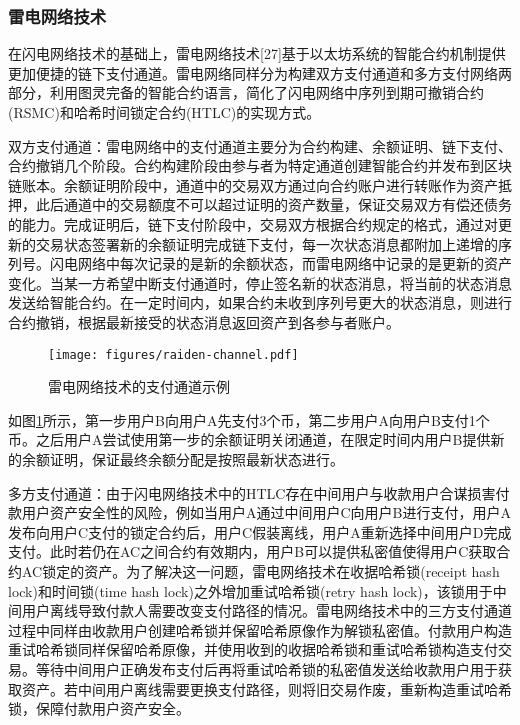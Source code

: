 \subsubsection{雷电网络技术}

在闪电网络技术的基础上，雷电网络技术[27]基于以太坊系统的智能合约机制提供更加便捷的链下支付通道。雷电网络同样分为构建双方支付通道和多方支付网络两部分，利用图灵完备的智能合约语言，简化了闪电网络中序列到期可撤销合约(RSMC)和哈希时间锁定合约(HTLC)的实现方式。

双方支付通道：雷电网络中的支付通道主要分为合约构建、余额证明、链下支付、合约撤销几个阶段。合约构建阶段由参与者为特定通道创建智能合约并发布到区块链账本。余额证明阶段中，通道中的交易双方通过向合约账户进行转账作为资产抵押，此后通道中的交易额度不可以超过证明的资产数量，保证交易双方有偿还债务的能力。完成证明后，链下支付阶段中，交易双方根据合约规定的格式，通过对更新的交易状态签署新的余额证明完成链下支付，每一次状态消息都附加上递增的序列号。闪电网络中每次记录的是新的余额状态，而雷电网络中记录的是更新的资产变化。当某一方希望中断支付通道时，停止签名新的状态消息，将当前的状态消息发送给智能合约。在一定时间内，如果合约未收到序列号更大的状态消息，则进行合约撤销，根据最新接受的状态消息返回资产到各参与者账户。

\begin{figure}
\centering
\texttt{[image: figures/raiden-channel.pdf]}
\caption{雷电网络技术的支付通道示例}
\label{fig:raiden-channel}
\end{figure}

如图\ref{fig:raiden-channel}所示，第一步用户B向用户A先支付3个币，第二步用户A向用户B支付1个币。之后用户A尝试使用第一步的余额证明关闭通道，在限定时间内用户B提供新的余额证明，保证最终余额分配是按照最新状态进行。

多方支付通道：由于闪电网络技术中的HTLC存在中间用户与收款用户合谋损害付款用户资产安全性的风险，例如当用户A通过中间用户C向用户B进行支付，用户A发布向用户C支付的锁定合约后，用户C假装离线，用户A重新选择中间用户D完成支付。此时若仍在AC之间合约有效期内，用户B可以提供私密值使得用户C获取合约AC锁定的资产。为了解决这一问题，雷电网络技术在收据哈希锁(receipt hash lock)和时间锁(time hash lock)之外增加重试哈希锁(retry hash lock)，该锁用于中间用户离线导致付款人需要改变支付路径的情况。雷电网络技术中的三方支付通道过程中同样由收款用户创建哈希锁并保留哈希原像作为解锁私密值。付款用户构造重试哈希锁同样保留哈希原像，并使用收到的收据哈希锁和重试哈希锁构造支付交易。等待中间用户正确发布支付后再将重试哈希锁的私密值发送给收款用户用于获取资产。若中间用户离线需要更换支付路径，则将旧交易作废，重新构造重试哈希锁，保障付款用户资产安全。

